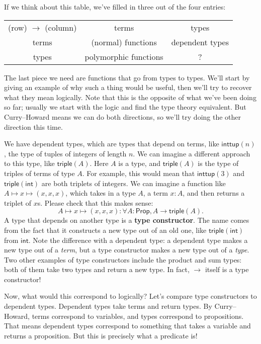 \documentclass[11pt,paper=letter]{scrartcl}
\newcommand{\sf}{\mathsf}
\newcommand{\prop}{\mathsf{Prop}}
\begin{document}
If we think about this table, we've filled in three out of the four entries:

\begin{center}
\begin{tabular}{ccc}
(row) $\to$ (column) & terms & types \\
terms & (normal) functions & dependent types \\
types & polymorphic functions & ?
\end{tabular}
\end{center}

The last piece we need are functions that go from types to types. We'll start by giving an example of why such a thing would be useful, then we'll try to recover what they mean logically. Note that this is the opposite of what we've been doing so far; usually we start with the logic and find the type theory equivalent. But Curry--Howard means we can do both directions, so we'll try doing the other direction this time.

We have dependent types, which are types that depend on terms, like $\sf{inttup}(n)$, the type of tuples of integers of length $n$. We can imagine a different approach to this type, like $\sf{triple}(A)$. Here $A$ is a type, and $\sf{triple}(A)$ is the type of triples of terms of type $A$. For example, this would mean that $\sf{inttup}(3)$ and $\sf{triple}(\sf{int})$ are both triplets of integers. We can imagine a function like $A \mapsto x \mapsto (x, x, x)$, which takes in a type $A$, a term $x: A$, and then returns a triplet of $x$s. Please check that this makes sense: \[
  A \mapsto x \mapsto (x, x, x): \forall A: \prop, A \to \sf{triple}(A).
\]
A type that depends on another type is a \textbf{type constructor}. The name comes from the fact that it constructs a new type out of an old one, like $\sf{triple}(\sf{int})$ from $\sf{int}$. Note the difference with a dependent type: a dependent type makes a new type out of a \emph{term}, but a type constructor makes a new type out of a \emph{type}. Two other examples of type constructors include the product and sum types: both of them take two types and return a new type. In fact, $\to$ itself is a type constructor!

Now, what would this correspond to logically? Let's compare type constructors to dependent types. Dependent types take terms and return types. By Curry--Howard, terms correspond to variables, and types correspond to propositions. That means dependent types correspond to something that takes a variable and returns a proposition. But this is precisely what a predicate is!
\end{document}
